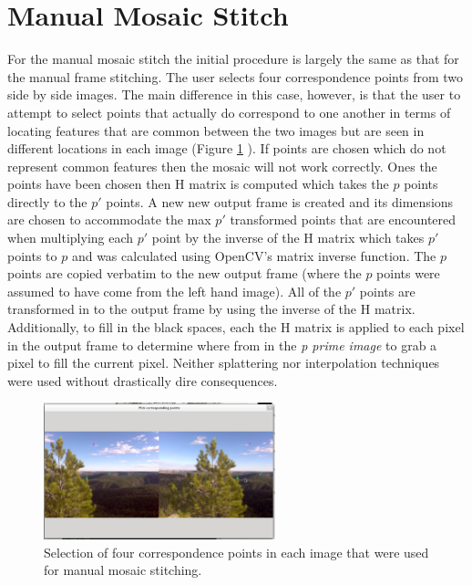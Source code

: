 \documentclass[10pt,twocolumn,letterpaper]{article}
\begin{document}
\section{Manual Mosaic Stitch}
For the manual mosaic stitch the initial procedure is largely the same as that for the manual frame stitching. The user selects four correspondence points from two side by side images. The main difference in this case, however, is that the user to attempt to select points that actually do correspond to one another in terms of locating features that are common between the two images but are seen in different locations in each image (Figure \ref{fig:man_mosaic_points} ). If points are chosen which do not represent common features then the mosaic will not work correctly. Ones the points have been chosen then H matrix is computed which takes  the $p$ points directly to the $p'$ points. A new new output frame is created and its dimensions are chosen to accommodate the max $p'$ transformed points that are encountered when multiplying each $p'$ point by the inverse of the H matrix which takes $p'$ points to $p$ and was calculated using OpenCV's matrix inverse function. The $p$ points are copied verbatim to the new output frame (where the $p$ points were assumed to have come from the left hand image). All of the $p'$ points are transformed in to the output frame by using the inverse of the H matrix. Additionally, to fill in the black spaces, each the H matrix is applied to each pixel in the output frame to determine where from in the \emph{p prime image } to grab a pixel to fill the current pixel. Neither splattering nor interpolation techniques were used without drastically dire consequences.

\begin{figure}[ht!]
\centering
\includegraphics[width=0.6\textwidth]{img/manual_mosaic_points.eps}
\caption{Selection of four correspondence points in each image that were used for manual mosaic stitching.}
\label{fig:man_mosaic_points}
\end{figure}
\end{document}
